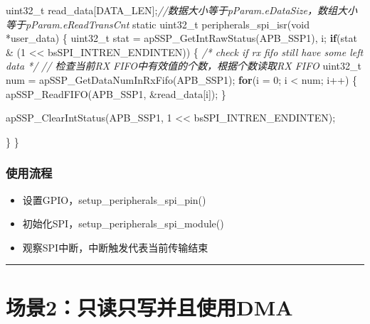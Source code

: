 \documentclass[
  12pt,
]{book}
\newenvironment{Shaded}{\begin{snugshade}}{\end{snugshade}}
\newcommand{\CommentTok}[1]{\textcolor[rgb]{0.56,0.35,0.01}{\textit{#1}}}
\newcommand{\ControlFlowTok}[1]{\textcolor[rgb]{0.13,0.29,0.53}{\textbf{#1}}}
\newcommand{\DataTypeTok}[1]{\textcolor[rgb]{0.13,0.29,0.53}{#1}}
\newcommand{\DecValTok}[1]{\textcolor[rgb]{0.00,0.00,0.81}{#1}}
\newcommand{\NormalTok}[1]{#1}
\providecommand{\tightlist}{%
  \setlength{\itemsep}{0pt}\setlength{\parskip}{0pt}}
\begin{document}
\begin{Shaded}
\begin{Highlighting}[]
\DataTypeTok{uint32_t}\NormalTok{ read_data[DATA_LEN];}\CommentTok{//数据大小等于pParam.eDataSize，数组大小等于pParam.eReadTransCnt}
\DataTypeTok{static} \DataTypeTok{uint32_t}\NormalTok{ peripherals_spi_isr(}\DataTypeTok{void}\NormalTok{ *user_data)}
\NormalTok{\{}
  \DataTypeTok{uint32_t}\NormalTok{ stat = apSSP_GetIntRawStatus(APB_SSP1), i;}
  \ControlFlowTok{if}\NormalTok{(stat & (}\DecValTok{1}\NormalTok{ << bsSPI_INTREN_ENDINTEN))}
\NormalTok{  \{}
    \CommentTok{/* check if rx fifo still have some left data */}
    \CommentTok{// 检查当前RX FIFO中有效值的个数，根据个数读取RX FIFO}
    \DataTypeTok{uint32_t}\NormalTok{ num = apSSP_GetDataNumInRxFifo(APB_SSP1);}
    \ControlFlowTok{for}\NormalTok{(i = }\DecValTok{0}\NormalTok{; i < num; i++)}
\NormalTok{    \{}
\NormalTok{      apSSP_ReadFIFO(APB_SSP1, &read_data[i]);}
\NormalTok{    \}}

\NormalTok{    apSSP_ClearIntStatus(APB_SSP1, }\DecValTok{1}\NormalTok{ << bsSPI_INTREN_ENDINTEN);}
    
\NormalTok{  \}}
\NormalTok{\}}
\end{Highlighting}
\end{Shaded}

\hypertarget{ux4f7fux7528ux6d41ux7a0b-11}{%
\subsubsection{使用流程}\label{ux4f7fux7528ux6d41ux7a0b-11}}

\begin{itemize}
\tightlist
\item
  设置GPIO，setup\_peripherals\_spi\_pin()
\item
  初始化SPI，setup\_peripherals\_spi\_module()
\item
  观察SPI中断，中断触发代表当前传输结束
\end{itemize}

\begin{center}\rule{0.5\linewidth}{0.5pt}\end{center}

\hypertarget{ux573aux666f2ux53eaux8bfbux53eaux5199ux5e76ux4e14ux4f7fux7528dma}{%
\section{场景2：只读只写并且使用DMA}\label{ux573aux666f2ux53eaux8bfbux53eaux5199ux5e76ux4e14ux4f7fux7528dma}}
\end{document}
